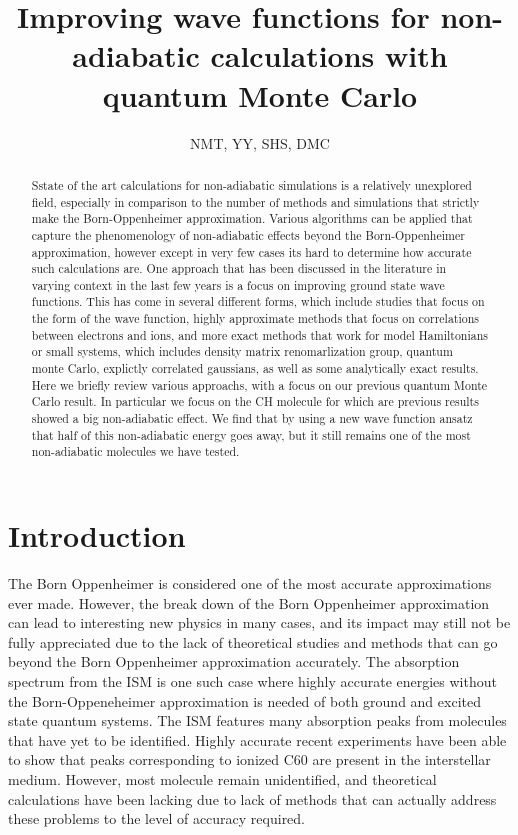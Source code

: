 \documentclass[aip,jcp,numerical,reprint]{revtex4-1}
\begin{document}
\title{Improving wave functions for non-adiabatic calculations with quantum Monte Carlo}
\author{NMT, YY, SHS, DMC}

\begin{abstract}
Sstate of the art calculations for non-adiabatic simulations is a relatively unexplored field, especially in comparison to the number of methods and simulations that strictly make the Born-Oppenheimer approximation.  Various algorithms can be applied that capture the phenomenology of non-adiabatic effects beyond the Born-Oppenheimer approximation, however except in very few cases its hard to determine how accurate such calculations are.  One approach that has been discussed in the literature in varying context in the last few years is a focus on improving ground state wave functions.  This has come in several different forms, which include studies that focus on the form of the wave function, highly approximate methods that focus on correlations between electrons and ions, and more exact methods that work for model Hamiltonians or small systems, which includes density matrix renomarlization group, quantum monte Carlo, explictly correlated gaussians, as well as some analytically exact results.  Here we briefly review various approachs, with a focus on our previous quantum Monte Carlo result.  In particular we focus on the CH molecule for which are previous results showed a big non-adiabatic effect.  We find that by using a new wave function ansatz that half of this non-adiabatic energy goes away, but it still remains one of the most non-adiabatic molecules we have tested.


\end{abstract}
\maketitle

\section{Introduction}
The Born Oppenheimer is considered one of the most accurate approximations ever made.  However, the break down of the Born Oppenheimer approximation can lead to interesting new physics in many cases, and its impact may still not be fully appreciated due to the lack of theoretical studies and methods that can go beyond the Born Oppenheimer approximation accurately.    The absorption spectrum from the ISM is one such case where highly accurate energies without the Born-Oppeneheimer approximation is needed of both ground and excited state quantum systems.   The ISM features many absorption peaks  from molecules that have yet to be identified.  Highly accurate recent experiments have been able to show that peaks corresponding to ionized C60 are present in the interstellar medium.  However, most molecule remain unidentified, and theoretical calculations have been lacking due to lack of methods that can actually address these problems to the level of accuracy required.  
\end{document}
